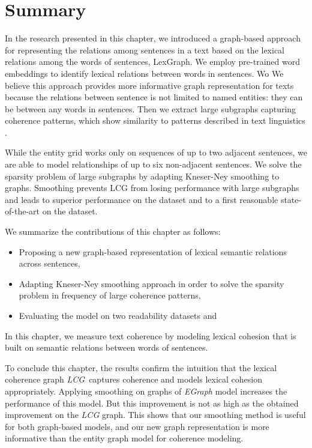 \section{Summary}
\label{sec:lex-graph-summary}
In the research presented in this chapter, we introduced a graph-based approach for representing the relations among sentences in a text based on the lexical relations among the words of sentences, LexGraph. 
We employ pre-trained word embeddings to identify lexical relations between words in sentences. 
Wo
We believe this approach provides more informative graph representation for texts because the relations between sentence is not limited to named entities: they can be between any words in sentences. 
Then we extract large subgraphs capturing coherence patterns, which show similarity to patterns described in
text linguistics \cite{danes74a}.

While the entity grid works only on sequences of up to two adjacent sentences, we are able to model relationships of up to six non-adjacent sentences. 
We solve the sparsity problem of large subgraphs by adapting \mbox{Kneser-Ney} smoothing to graphs. 
Smoothing prevents LCG from losing performance with large subgraphs and leads to superior performance on the  dataset and to a first reasonable \mbox{state-of-the-art} on the  dataset.

We summarize the contributions of this chapter as follows:

\begin{itemize}

  \item Proposing a new \mbox{graph-based} representation of lexical semantic relations across sentences,

  \item Adapting \mbox{Kneser-Ney} smoothing approach in order to solve the sparsity problem in frequency of large coherence patterns,  

  \item Evaluating the model on two readability datasets  and 

\end{itemize}

In this chapter, we measure text coherence by modeling lexical cohesion that is 
built on semantic relations between words of sentences. 


To conclude this chapter, the results confirm the intuition that the lexical coherence graph \emph{LCG}\ captures coherence and models lexical cohesion appropriately.
Applying smoothing on graphs of \emph{EGraph} model increases the performance of this model. 
But this improvement is not as high as the obtained improvement on the \emph{LCG} graph.
This shows that our smoothing method is useful for both graph-based models, and our new graph representation is more informative than the entity graph model for coherence modeling. 

